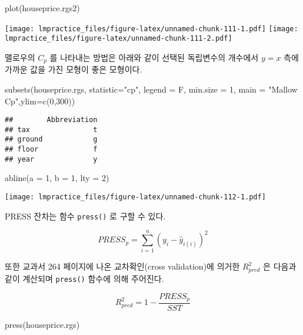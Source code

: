 \documentclass[
]{book}
\newenvironment{Shaded}{\begin{snugshade}}{\end{snugshade}}
\newcommand{\AttributeTok}[1]{\textcolor[rgb]{0.77,0.63,0.00}{#1}}
\newcommand{\DecValTok}[1]{\textcolor[rgb]{0.00,0.00,0.81}{#1}}
\newcommand{\FunctionTok}[1]{\textcolor[rgb]{0.00,0.00,0.00}{#1}}
\newcommand{\NormalTok}[1]{#1}
\newcommand{\StringTok}[1]{\textcolor[rgb]{0.31,0.60,0.02}{#1}}
\begin{document}
\begin{Shaded}
\begin{Highlighting}[]
\FunctionTok{plot}\NormalTok{(houseprice.rgs2)}
\end{Highlighting}
\end{Shaded}

\texttt{[image: lmpractice\_files/figure-latex/unnamed-chunk-111-1.pdf]} \texttt{[image: lmpractice\_files/figure-latex/unnamed-chunk-111-2.pdf]}

맬로우의 \(C_p\) 를 나타내는 방법은 아래와 같이 선택된 독립변수의 개수에서 \(y=x\) 측에 가까운 값을 가진 모형이 좋은 모형이다.

\begin{Shaded}
\begin{Highlighting}[]
\FunctionTok{subsets}\NormalTok{(houseprice.rgs, }\AttributeTok{statistic=}\StringTok{"cp"}\NormalTok{, }\AttributeTok{legend =}\NormalTok{ F, }\AttributeTok{min.size =} \DecValTok{1}\NormalTok{, }\AttributeTok{main =} \StringTok{"Mallow Cp"}\NormalTok{,}\AttributeTok{ylim=}\FunctionTok{c}\NormalTok{(}\DecValTok{0}\NormalTok{,}\DecValTok{300}\NormalTok{))}
\end{Highlighting}
\end{Shaded}

\begin{verbatim}
##        Abbreviation
## tax               t
## ground            g
## floor             f
## year              y
\end{verbatim}

\begin{Shaded}
\begin{Highlighting}[]
\FunctionTok{abline}\NormalTok{(}\AttributeTok{a =} \DecValTok{1}\NormalTok{, }\AttributeTok{b =} \DecValTok{1}\NormalTok{, }\AttributeTok{lty =} \DecValTok{2}\NormalTok{)}
\end{Highlighting}
\end{Shaded}

\texttt{[image: lmpractice\_files/figure-latex/unnamed-chunk-112-1.pdf]}

PRESS 잔차는 함수 \texttt{press()} 로 구할 수 있다.

\[ PRESS_p = \sum_{i=1}^n ( y_i - \hat y_{i(i)})^2 \]

또한 교과서 264 페이지에 나온 교차확인(cross validation)에 의거한 \(R^2_{pred}\) 은 다음과 같이 계산되며 \texttt{press()} 함수에 의해 주어진다.

\[ R^2_{pred} = 1 - \frac{PRESS_p}{SST} \]

\begin{Shaded}
\begin{Highlighting}[]
\FunctionTok{press}\NormalTok{(houseprice.rgs)}
\end{Highlighting}
\end{Shaded}
\end{document}
